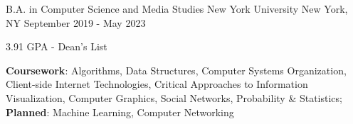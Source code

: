 

\begin{cventries}
  \cventry
    {B.A. in Computer Science and Media Studies} %
    {New York University} %
    {New York, NY} %
    {September 2019 - May 2023} %
    {
      \begin{cvitems} %
        \item {3.91 GPA - Dean's List}
        \item {\textbf{Coursework}: Algorithms, Data Structures, Computer Systems Organization, Client-side Internet Technologies, Critical Approaches to Information Visualization, Computer Graphics, Social Networks, Probability \& Statistics; \textbf{Planned}: Machine Learning, Computer Networking}
      \end{cvitems}
    }
\end{cventries}
